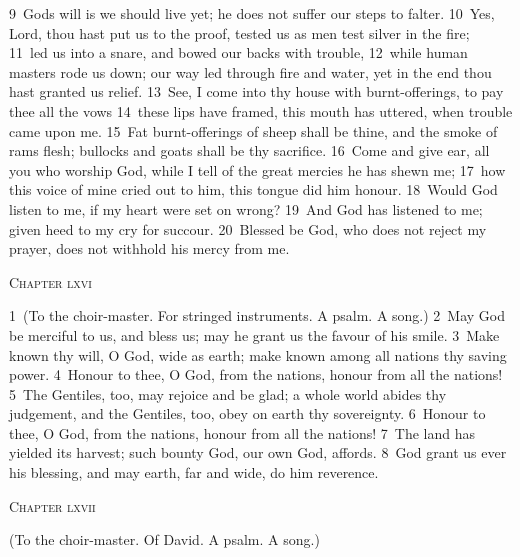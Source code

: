 \documentclass[10pt]{book} %
\begin{document}
\textcolor{benred8}{9}~God\textquotesingle s will is we should live yet; he does not suffer our steps to falter. \textcolor{benred8}{10}~Yes, Lord, thou hast put us to the proof, tested us as men test silver in the fire; \textcolor{benred8}{11}~led us into a snare, and bowed our backs with trouble, \textcolor{benred8}{12}~while human masters rode us down; our way led through fire and water, yet in the end thou hast granted us relief. \textcolor{benred8}{13}~See, I come into thy house with burnt-offerings, to pay thee all the vows \textcolor{benred8}{14}~these lips have framed, this mouth has uttered, when trouble came upon me. \textcolor{benred8}{15}~Fat burnt-offerings of sheep shall be thine, and the smoke of ram\textquotesingle s flesh; bullocks and goats shall be thy sacrifice. \textcolor{benred8}{16}~Come and give ear, all you who worship God, while I tell of the great mercies he has shewn me; \textcolor{benred8}{17}~how this voice of mine cried out to him, this tongue did him honour. \textcolor{benred8}{18}~Would God listen to me, if my heart were set on wrong? \textcolor{benred8}{19}~And God has listened to me; given heed to my cry for succour. \textcolor{benred8}{20}~Blessed be God, who does not reject my prayer, does not withhold his mercy from me.
\begin{large}\begin{center}\textsc{Chapter lxvi}\end{center}\end{large}
\textcolor{benred8}{1}~(To the choir-master. For stringed instruments. A psalm. A song.)
\textcolor{benred8}{2}~May God be merciful to us, and bless us; may he grant us the favour of his smile. \textcolor{benred8}{3}~Make known thy will, O God, wide as earth; make known among all nations thy saving power. \textcolor{benred8}{4}~Honour to thee, O God, from the nations, honour from all the nations! \textcolor{benred8}{5}~The Gentiles, too, may rejoice and be glad; a whole world abides thy judgement, and the Gentiles, too, obey on earth thy sovereignty. \textcolor{benred8}{6}~Honour to thee, O God, from the nations, honour from all the nations! \textcolor{benred8}{7}~The land has yielded its harvest; such bounty God, our own God, affords. \textcolor{benred8}{8}~God grant us ever his blessing, and may earth, far and wide, do him reverence.
\begin{large}\begin{center}\textsc{Chapter lxvii}\end{center}\end{large}
(To the choir-master. Of David. A psalm. A song.)
\end{document}
